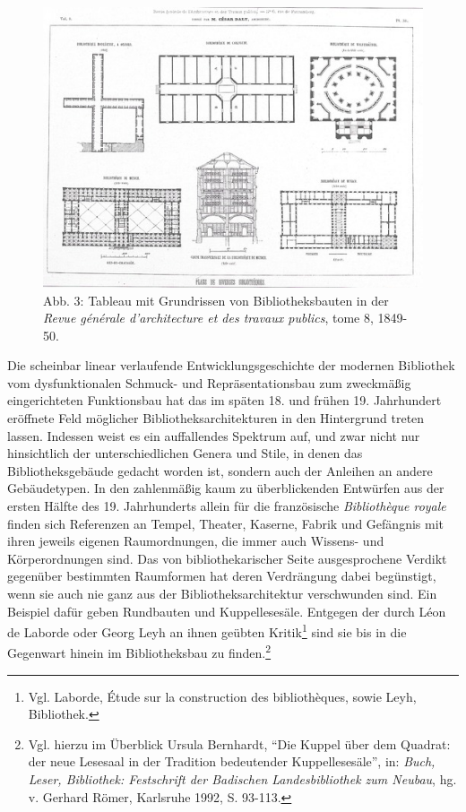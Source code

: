 \begin{figure}[htbp]
\centering
\includegraphics{img/wagner-3.jpg}
\caption*{Abb. 3: Tableau mit Grundrissen von Bibliotheksbauten in der
\emph{Revue générale d'architecture et des travaux publics}, tome 8,
1849-50.}
\end{figure}

Die scheinbar linear verlaufende Entwicklungsgeschichte der modernen
Bibliothek vom dysfunktionalen Schmuck- und Repräsentationsbau zum
zweckmäßig eingerichteten Funktionsbau hat das im späten 18. und frühen
19. Jahrhundert eröffnete Feld möglicher Bibliotheksarchitekturen in den
Hintergrund treten lassen. Indessen weist es ein auffallendes Spektrum
auf, und zwar nicht nur hinsichtlich der unterschiedlichen Genera und
Stile, in denen das Bibliotheksgebäude gedacht worden ist, sondern auch
der Anleihen an andere Gebäudetypen. In den zahlenmäßig kaum zu
überblickenden Entwürfen aus der ersten Hälfte des 19. Jahrhunderts
allein für die französische \emph{Bibliothèque royale} finden sich
Referenzen an Tempel, Theater, Kaserne, Fabrik und Gefängnis mit ihren
jeweils eigenen Raumordnungen, die immer auch Wissens- und
Körperordnungen sind. Das von bibliothekarischer Seite ausgesprochene
Verdikt gegenüber bestimmten Raumformen hat deren Verdrängung dabei
begünstigt, wenn sie auch nie ganz aus der Bibliotheksarchitektur
verschwunden sind. Ein Beispiel dafür geben Rundbauten und
Kuppellesesäle. Entgegen der durch Léon de Laborde oder Georg Leyh an
ihnen geübten Kritik\footnote{Vgl. Laborde, Étude sur la construction
  des bibliothèques, sowie Leyh, Bibliothek.} sind sie bis in die
Gegenwart hinein im Bibliotheksbau zu finden.\footnote{Vgl. hierzu im
  Überblick Ursula Bernhardt, \enquote{Die Kuppel über dem Quadrat: der
  neue Lesesaal in der Tradition bedeutender Kuppellesesäle}, in:
  \emph{Buch, Leser, Bibliothek: Festschrift der Badischen
  Landesbibliothek zum Neubau}, hg. v. Gerhard Römer, Karlsruhe 1992, S.
  93-113.}

